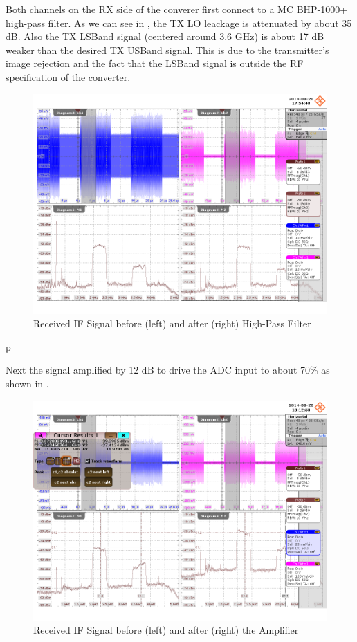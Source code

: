Both channels on the \gls{RX} side of the converer first connect to a
\gls{MC} BHP-1000+ high-pass filter. As we can see in ,
the \gls{TX} \gls{LO} leackage is attenuated by about 35 dB. Also the \gls{TX}
\gls{LSBand} signal (centered around 3.6 GHz) is about 17 dB weaker than
the desired \gls{TX} \gls{USBand} signal. This is due to the transmitter's
image rejection and the fact that the \gls{LSBand} signal is outside the
\gls{RF} specification of the converter. \\

\begin{figure}[p]
  \centering
  \includegraphics[width=\textwidth]{figures/osci/res_450_rx_if}
  \caption{Received \gls{IF} Signal before (left) and after (right) High-Pass Filter}
  \label{fig:res_450_rx_if}
\end{figure}p

Next the signal amplified by 12 dB to drive the \gls{ADC} input to about 70\%
as shown in . \\

\begin{figure}[p]
  \centering
  \includegraphics[width=\textwidth]{figures/osci/res_450_rx_amp}
  \caption{Received \gls{IF} Signal before (left) and after (right) the Amplifier}
  \label{fig:res_450_rx_amp}
\end{figure}

